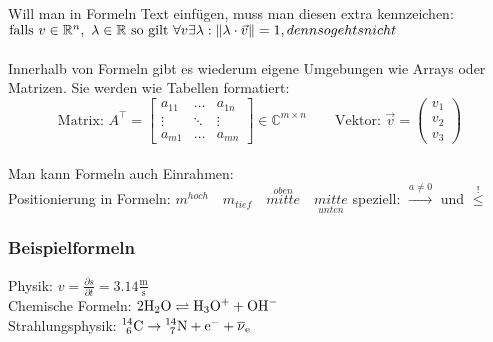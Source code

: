 	Will man in Formeln Text einfügen, muss man diesen extra kennzeichen:\\
	$\text{falls } v \in \mathbb R^n,\ \lambda \in \mathbb R \text{ so gilt } \forall v \exists \lambda: \|  \lambda \cdot \vec v  \| = 1, denn so gehts nicht$\\
	\\
	Innerhalb von Formeln gibt es wiederum eigene Umgebungen wie Arrays oder Matrizen. Sie werden wie Tabellen formatiert:
	\begin{equation}
		\text{Matrix: } A^\top = \begin{bmatrix} a_{11} & \hdots & a_{1n} \\ \vdots & \ddots & \vdots \\ a_{m1} & \hdots & a_{mn} \end{bmatrix} \in \mathbb C^{m \times n} \qquad
		\text{Vektor: } \vec v = \begin{pmatrix} v_1 \\ v_2 \\ v_3 \end{pmatrix}
	\end{equation}
	\\
	Man kann Formeln auch Einrahmen:  \\
	Positionierung in Formeln: $m^{hoch} \quad m_{tief} \quad \overset{oben}{mitte} \quad \underset{unten}{mitte}$ \qquad speziell: $\xrightarrow{a \ne 0}$ und $\stackrel{!}\le$\\
		\subsubsection{Beispielformeln}
		Physik: $v = \frac{\partial s}{\partial t} = 3.14 \mathrm{\frac{m}{ s}}$\\
		Chemische Formeln: $\displaystyle{ \mathrm{2H_2O \rightleftharpoons H_3 O^{+} + OH^-}}$\\
		Strahlungsphysik: $\displaystyle{ \mathrm{ ^{14}_{\ 6} C \rightarrow {}^{14}_{\ 7} N + e^- + \overline \nu_e}}$


